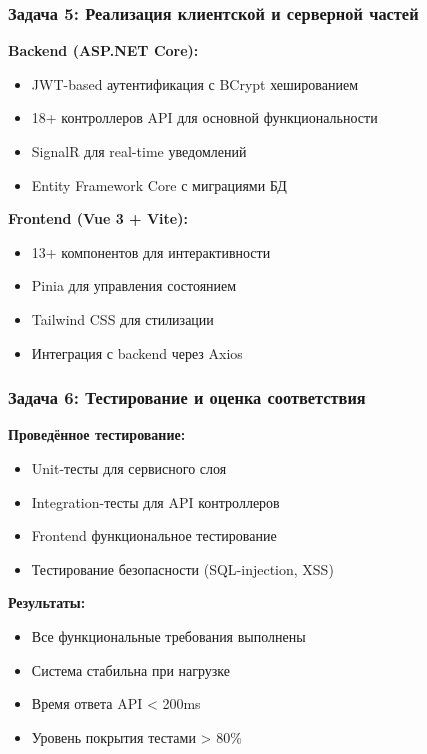 \documentclass[aspectratio=43,11pt]{beamer}
\begin{document}
\begin{frame}
    \frametitle{Задача 5: Реализация клиентской и серверной частей}
    
    \textbf{Backend (ASP.NET Core):}
    \begin{itemize}
        \item JWT-based аутентификация с BCrypt хешированием
        \item 18+ контроллеров API для основной функциональности
        \item SignalR для real-time уведомлений
        \item Entity Framework Core с миграциями БД
    \end{itemize}
    
    \bigskip
    
    \textbf{Frontend (Vue 3 + Vite):}
    \begin{itemize}
        \item 13+ компонентов для интерактивности
        \item Pinia для управления состоянием
        \item Tailwind CSS для стилизации
        \item Интеграция с backend через Axios
    \end{itemize}
\end{frame}

\begin{frame}
    \frametitle{Задача 6: Тестирование и оценка соответствия}
    
    \textbf{Проведённое тестирование:}
    \begin{itemize}
        \item Unit-тесты для сервисного слоя
        \item Integration-тесты для API контроллеров
        \item Frontend функциональное тестирование
        \item Тестирование безопасности (SQL-injection, XSS)
    \end{itemize}
    
    \bigskip
    
    \textbf{Результаты:}
    \begin{itemize}
        \item Все функциональные требования выполнены
        \item Система стабильна при нагрузке
        \item Время ответа API < 200ms
        \item Уровень покрытия тестами > 80\%
    \end{itemize}
\end{frame}
\end{document}
